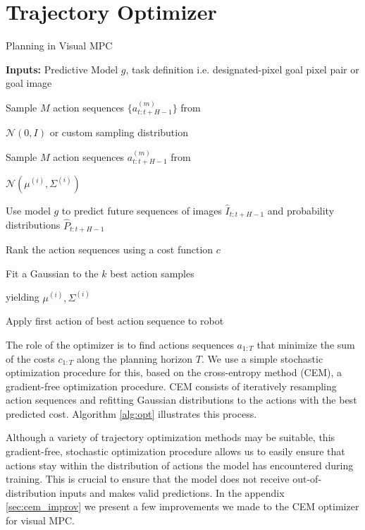 \section{Trajectory Optimizer}

\begin{algorithm}[ht]
\caption{Planning in Visual MPC}
\label{alg:opt}
\begin{algorithmic}[1]
\State \textbf{Inputs:} Predictive Model $g$, task definition i.e. designated-pixel goal pixel pair or goal image

\State \begin{varwidth}[t]{\linewidth}
	Sample $M$ action sequences $\{a^{(m)}_{t:t+H-1}\}$ from \par $\mathcal N(0, I)$ or
	custom sampling distribution
\end{varwidth}
\Else
\State \begin{varwidth}[t]{\linewidth}
	Sample $M$ action sequences ${a^{(m)}_{t:t+H-1}}$ from \par 
	$\mathcal N(\mu^{(i)}, \Sigma^{(i)})$
\end{varwidth}
\EndIf
\State  \begin{varwidth}[t]{\linewidth}
	Use model $g$ to predict future sequences of images $\hat{I}_{t:t+H-1}$ and probability distributions $\hat{P}_{t:t+H-1}$
\end{varwidth}
\State Rank the action sequences using a cost function $c$
\State  \begin{varwidth}[t]{\linewidth}
	Fit a Gaussian to the $k$ best action samples \par 
	yielding $\mu^{(i)}, \Sigma^{(i)}$
\end{varwidth}
\EndFor
\State Apply first action of best action sequence to robot
\EndFor
\end{algorithmic}
\end{algorithm}


\label{sec:optimizer}
The role of the optimizer is to find actions sequences $a_{1:T}$ that minimize the sum of the costs $c_{1:T}$ along the planning horizon $T$. We use a simple stochastic optimization procedure for this, based on the cross-entropy method (CEM), a gradient-free optimization procedure.
CEM consists of iteratively resampling action sequences and refitting Gaussian distributions to the actions with the best predicted cost. Algorithm \ref{alg:opt} illustrates this process.

Although a variety of trajectory optimization methods may be suitable, this gradient-free, stochastic optimization procedure allows us to easily ensure that actions stay within the distribution of actions the model has encountered during training. This is crucial to ensure that the model does not receive out-of-distribution inputs and makes valid predictions. In the appendix \ref{sec:cem_improv} we present a few improvements we made to the CEM optimizer for visual MPC.
